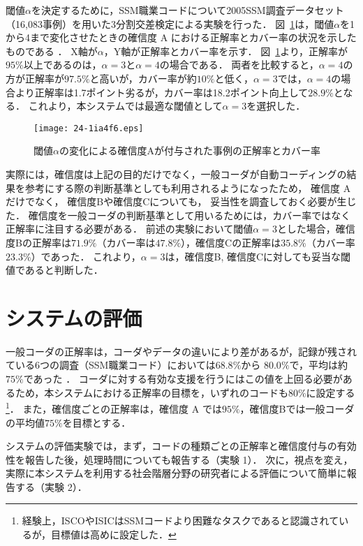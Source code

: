 \documentclass[japanese]{jnlp_1.4}
\begin{document}
閾値$\alpha$を決定するために，SSM職業コードについて2005SSM調査データセット（16,083事例）を用いた3分割交差検定による実験を行った．
図~\ref{fg7}は，閾値$\alpha$を1から4まで変化させたときの確信度 A における正解率とカバー率の状況を示したものである \cite{Takahashi_et_al14}．
X軸が$\alpha$，Y軸が正解率とカバー率を示す．
図~\ref{fg7}より，正解率が$95\%$以上であるのは，$\alpha=3$と$\alpha=4$の場合である．
両者を比較すると，$\alpha=4$の方が正解率が$97.5\%$と高いが，カバー率が約$10\%$と低く，$\alpha=3$では，$\alpha=4$の場合より正解率は1.7ポイント劣るが，カバー率は18.2ポイント向上して$28.9\%$となる．
これより，本システムでは最適な閾値として$\alpha=3$を選択した．

\begin{figure}[t]
\begin{center}
\texttt{[image: 24-1ia4f6.eps]}
\end{center}
\caption{閾値$\alpha$の変化による確信度Aが付与された事例の正解率とカバー率}
\label{fg7}
\end{figure}

実際には，確信度は上記の目的だけでなく，一般コーダが自動コーディングの結果を参考にする際の判断基準としても利用されるようになったため， 確信度 A だけでなく， 確信度Bや確信度Cについても， 妥当性を調査しておく必要が生じた．
確信度を一般コーダの判断基準として用いるためには，カバー率ではなく正解率に注目する必要がある．
前述の実験において閾値$\alpha=3$とした場合，確信度Bの正解率は$71.9\%$（カバー率は$47.8\%$），確信度Cの正解率は$35.8\%$（カバー率$23.3\%$）であった．
これより，$\alpha=3$は，確信度B, 確信度Cに対しても妥当な閾値であると判断した．


\section{システムの評価}

一般コーダの正解率は，コーダやデータの違いにより差があるが，記録が残されている6つの調査（SSM職業コード）においては$68.8\%$から $80.0\%$で，平均は約$75\%$であった \cite{Takahashi02a}．
コーダに対する有効な支援を行うにはこの値を上回る必要があるため，本システムにおける正解率の目標を，いずれのコードも$80\%$に設定する\footnote{経験上，ISCOやISICはSSMコードより困難なタスクであると認識されているが，目標値は高めに設定した．}．
また，確信度ごとの正解率は，確信度 A では$95\%$，確信度Bでは一般コーダの平均値$75\%$を目標とする． 

システムの評価実験では，まず，コードの種類ごとの正解率と確信度付与の有効性を報告した後，処理時間についても報告する（実験 1）．
次に，視点を変え，実際に本システムを利用する社会階層分野の研究者による評価について簡単に報告する（実験 2）．
\end{document}
